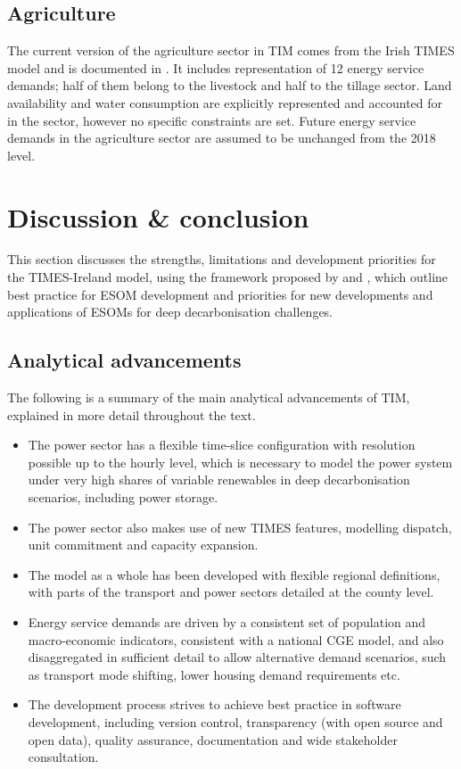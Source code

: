 \documentclass[journal abbreviation, manuscript]{copernicus}
\begin{document}
\subsection{Agriculture}
\label{ss:agriculture}
The current version of the agriculture sector in TIM comes from the Irish TIMES model and is documented in \citet{Chiodi2016}. It includes representation of 12 energy service demands; half of them belong to the livestock and half to the tillage sector. Land availability and water consumption are explicitly represented and accounted for in the sector, however no specific constraints are set. Future energy service demands in the agriculture sector are assumed to be unchanged from the 2018 level.



\section{Discussion \& conclusion}
\label{s:discussion}
This section discusses the strengths, limitations and development priorities for the TIMES-Ireland model, using the framework proposed by \citet{Pye2020} and \citet{DeCarolis2017}, which outline best practice for ESOM development and priorities for new developments and applications of ESOMs for deep decarbonisation challenges.

\subsection{Analytical advancements}
The following is a summary of the main analytical advancements of TIM, explained in more detail throughout the text. 
\begin{itemize}
\item The power sector has a flexible time-slice configuration with resolution possible up to the hourly level, which is necessary to model the power system under very high shares of variable renewables in deep decarbonisation scenarios, including power storage. 
\item The power sector also makes use of new TIMES features, modelling dispatch, unit commitment and capacity expansion.
\item The model as a whole has been developed with flexible regional definitions, with parts of the transport and power sectors detailed at the county level. 
\item Energy service demands are driven by a consistent set of population and macro-economic indicators, consistent with a national CGE model, and also disaggregated in sufficient detail to allow alternative demand scenarios, such as transport mode shifting, lower housing demand requirements etc.
\item The development process strives to achieve best practice in software development, including version control, transparency (with open source and open data), quality assurance, documentation and wide stakeholder consultation. 
\end{itemize}
\end{document}
